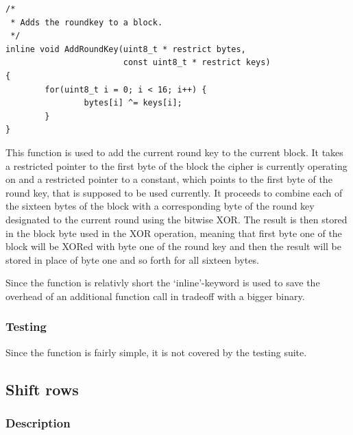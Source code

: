 \begin{lstlisting}
/*
 * Adds the roundkey to a block.
 */
inline void AddRoundKey(uint8_t * restrict bytes, 
                        const uint8_t * restrict keys)
{
        for(uint8_t i = 0; i < 16; i++) {
                bytes[i] ^= keys[i];
        }
}
\end{lstlisting}

This function is used to add the current round key to the current block.
It takes a restricted pointer to the first byte of the block the cipher
is currently operating on and a restricted pointer to a constant, which
points to the first byte of the round key, that is supposed to be used
currently. It proceeds to combine each of the sixteen bytes of the block
with a corresponding byte of the round key designated to the current
round using the bitwise XOR. The result is then stored in the block byte
used in the XOR operation, meaning that first byte one of the block will
be XORed with byte one of the round key and then the result will be
stored in place of byte one and so forth for all sixteen bytes.

Since the function is relativly short the `inline'-keyword is used to
save the overhead of an additional function call in tradeoff with a
bigger binary.

\hypertarget{testing-2}{%
\subsubsection{Testing}\label{testing-2}}

Since the function is fairly simple, it is not covered by the testing
suite.

\hypertarget{shift-rows}{%
\subsection{Shift rows}\label{shift-rows}}

\hypertarget{description-3}{%
\subsubsection{Description}\label{description-3}}

